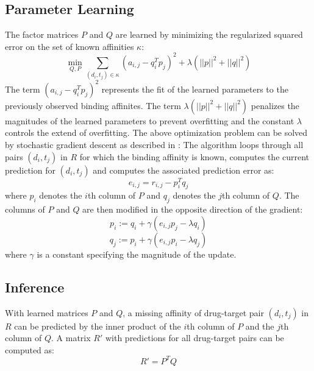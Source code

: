 \subsection{Parameter Learning}

The factor matrices $P$ and $Q$ are learned by minimizing the regularized squared error on the set of known affinities $\kappa$:
\begin{equation}
\min\limits_{Q,P}{\sum\limits_{(d_i,t_j)\in \kappa} (a_{i,j}-q_i^Tp_j)^2} + \lambda (||p||^2 + ||q||^2)
\end{equation}
The term $(a_{i,j}-q_i^Tp_j)^2$ represents the fit of the learned parameters to the previously observed binding affinites. The term $\lambda (||p||^2 + ||q||^2)$ penalizes the magnitudes of the learned parameters to prevent overfitting and the constant $\lambda$ controls the extend of overfitting.
The above optimization problem can be solved by stochastic gradient descent as described in \cite{Koren:2009:MFT:1608565.1608614}:
The algorithm loops through all pairs $(d_i, t_j)$ in $R$ for which the binding affinity is known, computes the current prediction for $(d_i, t_j)$ and computes the associated prediction error as:
\begin{equation}
e_{i,j} = r_{i,j} - p_i^Tq_j
\end{equation}
where $p_i$ denotes the $i$th column of $P$ and $q_j$ denotes the $j$th column of $Q$. The columns of $P$ and $Q$ are then modified in the opposite direction of the gradient:
\begin{equation}
p_i:= q_i + \gamma (e_{i,j} p_j - \lambda q_i)
\end{equation}
\begin{equation}
q_j:=p_i + \gamma (e_{i,j} p_i - \lambda q_j)
\end{equation}
where $\gamma$ is a constant specifying the magnitude of the update.

\subsection{Inference}

With learned matrices $P$ and $Q$, a missing affinity of drug-target pair $(d_i, t_j)$ in $R$ can be predicted by the inner product of the $i$th column of $P$ and the $j$th column of $Q$. A matrix $R'$ with predictions for all drug-target pairs can be computed as:
\begin{equation}
R' = P^TQ
\end{equation}

